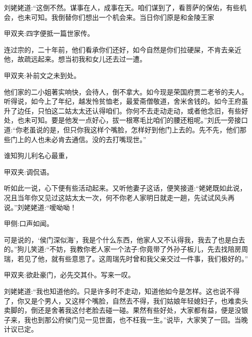 \begin{parag}
    刘姥姥道:“这倒不然。谋事在人，成事在天。咱们谋到了，看菩萨的保佑，有些机会，也未可知。我倒替你们想出一个机会来。当日你们原是和金陵王家\begin{note}甲双夹:四字便抵一篇世家传。\end{note}连过宗的，二十年前，他们看承你们还好，如今自然是你们拉硬屎，不肯去亲近他，故疏远起来。想当初我和女儿还去过一遭。\begin{note}甲双夹:补前文之未到处。\end{note}他们家的二小姐著实响快，会待人，倒不拿大。如今现是荣国府贾二老爷的夫人。听得说，如今上了年纪，越发怜贫恤老，最爱斋僧敬道，舍米舍钱的。如今王府虽升了边任，只怕这二姑太太还认得咱们。你何不去走动走动，或者他念旧，有些好处，也未可知。要是他发一点好心，拔一根寒毛比咱们的腰还粗呢。”刘氏一旁接口道:“你老虽说的是，但只你我这样个嘴脸，怎样好到他门上去的。先不先，他们那些门上的人也未必肯去通信。没的去打嘴现世。”
\end{parag}


\begin{parag}
    谁知狗儿利名心最重，\begin{note}甲双夹:调侃语。\end{note}听如此一说，心下便有些活动起来。又听他妻子这话，便笑接道:“姥姥既如此说，况且当年你又见过这姑太太一次，何不你老人家明日就走一趟，先试试风头再说。”刘姥姥道:“嗳呦呦！\begin{note}甲侧:口声如闻。\end{note}可是说的，‘侯门深似海’，我是个什么东西，他家人又不认得我，我去了也是白去的。”狗儿笑道:“不妨，我教你老人家一个法子:你竟带了外孙子板儿，先去找陪房周瑞，若见了他，就有些意思了。这周瑞先时曾和我父亲交过一件事，我们极好的。”\begin{note}甲双夹:欲赴豪门，必先交其仆。写来一叹。\end{note}刘姥姥道:“我也知道他的。只是许多时不走动，知道他如今是怎样。这也说不得了，你又是个男人，又这样个嘴脸，自然去不得，我们姑娘年轻媳妇子，也难卖头卖脚的，倒还是舍著我这付老脸去碰一碰。果然有些好处，大家都有益，便是没银子来，我也到那公府侯门见一见世面，也不枉我一生。”说毕，大家笑了一回。当晚计议已定。
\end{parag}


